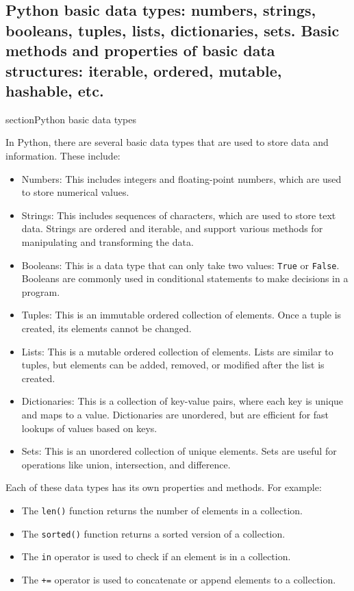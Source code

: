 \documentclass[12pt, a4paper, oneside]{article}
\begin{document}
\subsection{ Python basic data types: numbers, strings, booleans, tuples, lists, dictionaries, sets. Basic methods and properties of basic data structures: iterable, ordered, mutable, hashable, etc. }

section{Python basic data types}

In Python, there are several basic data types that are used to store data and information. These include:

\begin{itemize}
\item Numbers: This includes integers and floating-point numbers, which are used to store numerical values.
\item Strings: This includes sequences of characters, which are used to store text data. Strings are ordered and iterable, and support various methods for manipulating and transforming the data.
\item Booleans: This is a data type that can only take two values: \texttt{True} or \texttt{False}. Booleans are commonly used in conditional statements to make decisions in a program.
\item Tuples: This is an immutable ordered collection of elements. Once a tuple is created, its elements cannot be changed.
\item Lists: This is a mutable ordered collection of elements. Lists are similar to tuples, but elements can be added, removed, or modified after the list is created.
\item Dictionaries: This is a collection of key-value pairs, where each key is unique and maps to a value. Dictionaries are unordered, but are efficient for fast lookups of values based on keys.
\item Sets: This is an unordered collection of unique elements. Sets are useful for operations like union, intersection, and difference.
\end{itemize}

Each of these data types has its own properties and methods. For example:

\begin{itemize}
\item The \texttt{len()} function returns the number of elements in a collection.
\item The \texttt{sorted()} function returns a sorted version of a collection.
\item The \texttt{in} operator is used to check if an element is in a collection.
\item The \texttt{+=} operator is used to concatenate or append elements to a collection.
\end{itemize}
\end{document}
